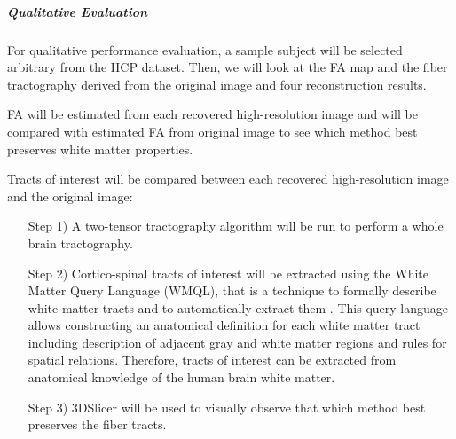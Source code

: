 \subparagraph{Qualitative Evaluation}
For qualitative performance evaluation, a sample subject will be selected arbitrary from the HCP dataset. Then, we will look at the FA map and the fiber tractography derived from the original image and four reconstruction results.

FA will be estimated from each recovered high-resolution image and will be compared with estimated FA from original image to see which method best preserves white matter properties.

Tracts of interest will be compared between each recovered high-resolution image and the original image:
\begin{itemize}
\item[Step 1)] A two-tensor tractography algorithm \cite{Malcolm2010, baumgartner2012} will be run to perform a whole brain tractography.

\item[Step 2)] Cortico-spinal tracts of interest will be extracted using the White Matter Query Language (WMQL), that is a technique to formally describe white matter tracts and to automatically extract them \cite{wassermann2013}.
This query language allows constructing an anatomical definition for each white matter tract including description of adjacent gray and white matter regions and rules for spatial relations. Therefore, tracts of interest can be extracted from anatomical knowledge of the human brain white matter.

\item[Step 3)] 3DSlicer \cite{slicer_paper} will be used to visually observe that which method best preserves the fiber tracts.
\end{itemize}












\clearpage